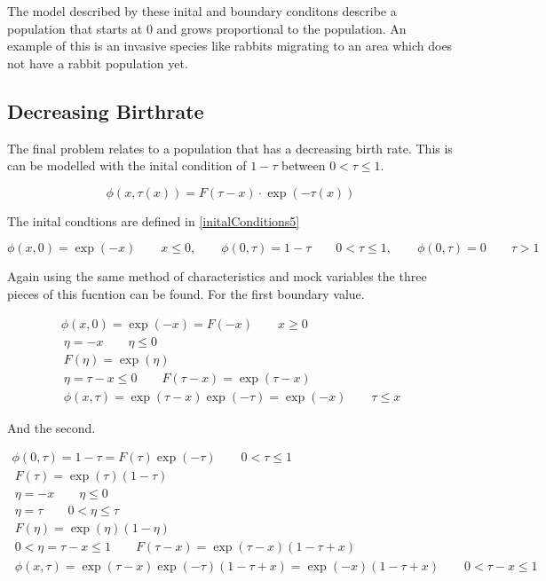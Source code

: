 \documentclass[paper=a4, fontsize=11pt]{scrartcl} %
\numberwithin{equation}{section} %
\numberwithin{figure}{section} %
\numberwithin{table}{section} %
\begin{document}
The model described by these inital and boundary conditons describe a population that starts at 0 and grows proportional to the population. An example of this is an invasive species like rabbits migrating to an area which does not have a rabbit population yet.

\subsection{Decreasing Birthrate}

The final problem relates to a population that has a decreasing birth rate. This is can be modelled with the inital condition of $1-\tau$ between $0 < \tau \le 1$.


\begin{equation} \label{eq:gensol}
	\phi(x, \tau(x)) = F(\tau-x)\cdot\exp(-\tau(x))
\end{equation}

The inital condtions are defined in \ref{initalConditions5}

\begin{equation} \label{initalConditions5}
	\phi(x,0) = \exp(-x) \qquad x \le 0, \qquad \phi(0,\tau)=1-\tau \qquad 0 <\tau \le 1,\qquad \phi(0,\tau)=0 \qquad \tau >1
\end{equation}

Again using the same method of characteristics and mock variables the three pieces of this fucntion can be found. For the first boundary value.

\begin{align}
	\phi(x,0) = \exp(-x) = F(-x) \qquad x \ge 0\\
	~
	\eta = -x \qquad \eta \le 0\\
	~
	F(\eta)=\exp(\eta)\\
	~
	\eta = \tau-x \le 0 \qquad F(\tau-x) = \exp(\tau-x)\\
	~
	\phi(x,\tau) = \exp(\tau-x)\exp(-\tau)=\exp(-x) \qquad \tau \le x
\end{align}

And the second.

\begin{align}
	\phi(0,\tau) = 1-\tau = F(\tau)\exp(-\tau) \qquad 0 < \tau \le 1\\
	~
	F(\tau)=\exp(\tau)(1-\tau) \\
	~
	\eta = -x \qquad \eta \le 0\\
	~
	\eta = \tau \qquad 0 < \eta \le \tau\\
	~
	F(\eta) = \exp(\eta)(1-\eta)\\
	~
	0 <\eta = \tau-x \le 1 \qquad F(\tau-x) = \exp(\tau-x)(1-\tau+x)\\
	~
	\phi(x,\tau) = \exp(\tau-x)\exp(-\tau)(1-\tau+x)=\exp(-x)(1-\tau+x) \qquad 0< \tau-x \le 1
\end{align}
\end{document}
